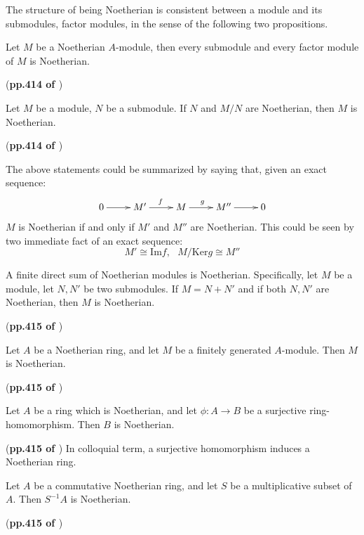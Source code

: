 \documentclass{article}
\begin{document}
The structure of being Noetherian is consistent between a module
and its submodules, factor modules, in the sense of the 
following two propositions.

\begin{prop}
    \label{prop:Noetherian.1.1}
    Let $M$ be a Noetherian $A$-module, then every submodule and
    every factor module of $M$ is Noetherian.
\end{prop}
(\textbf{pp.414 of \cite{lang}})

\begin{prop}
    \label{prop:Noetherian.1.2}
    Let $M$ be a module, $N$ be a submodule. If $N$ and $M/N$ are
    Noetherian, then $M$ is Noetherian.
\end{prop}
(\textbf{pp.414 of \cite{lang}})

The above statements could be summarized by saying that, given an
exact sequence:
\begin{align*}
    \xymatrix{
    0\ar[r] & M'\ar[r]^f & M\ar[r]^g & M''\ar[r] & 0
    }
\end{align*}
$M$ is Noetherian if and only if $M'$ and $M''$ are Noetherian.
This could be seen by two immediate fact of an exact sequence:
\[
    M'\cong \text{Im}f, \text{ } M/\text{Ker}g \cong M''
\]

\begin{coro}
    \label{coro:Noetherian.1.3}
    A finite direct sum of Noetherian modules is Noetherian. Specifically,
    let $M$ be a module, let $N,N'$ be two submodules. If $M=N+N'$ and if
    both $N,N'$ are Noetherian, then $M$ is Noetherian.
\end{coro}
(\textbf{pp.415 of \cite{lang}})
\begin{prop}
    \label{prop:Noetherian.1.4}
    Let $A$ be a Noetherian ring, and let $M$ be a finitely generated
    $A$-module. Then $M$ is Noetherian.
\end{prop}
(\textbf{pp.415 of \cite{lang}})
\begin{prop}
    \label{prop:Noetherian.1.5}
    Let $A$ be a ring which is Noetherian, and let $\phi:A\to B$ be
    a surjective ring-homomorphism. Then $B$ is Noetherian.
\end{prop}
(\textbf{pp.415 of \cite{lang}})
In colloquial term, a surjective homomorphism induces a Noetherian ring.
\begin{prop}
    \label{prop:Noetherian.1.6}
    Let $A$ be a commutative Noetherian ring, and let $S$ be a
    multiplicative subset of $A$. Then $S^{-1}A$ is Noetherian.
\end{prop}
(\textbf{pp.415 of \cite{lang}})
\end{document}

